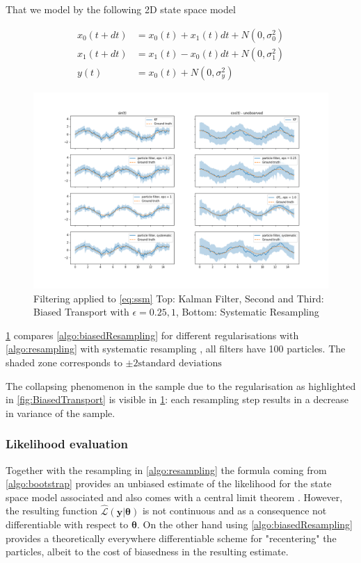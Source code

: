 \documentclass[]{article}
\begin{document}
			That we model by the following 2D state space model

			\begin{align}
				\label{eq:ssm}
				x_0(t + dt) &= x_0(t) + x_1(t) dt + N(0, \sigma_0^2)\\				
				x_1(t + dt) &= x_1(t) - x_0(t) dt + N(0, \sigma_1^2)\\
				y(t) &= x_0(t) + N(0, \sigma_y^2)
			\end{align}
			
			\begin{figure}
				\centering
				\captionsetup{justification=centering}
				\includegraphics[width=\linewidth]{KF_OptimalTransportPF_comp}
				\caption{Filtering applied to \cref{eq:ssm}
				Top: Kalman Filter, Second and Third: Biased Transport with $\epsilon=0.25,1$, Bottom: Systematic Resampling }
				\label{fig:kf_illustration}
			\end{figure}	
		
			\cref{fig:kf_illustration} compares \cref{algo:biasedResampling} for different regularisations with \cref{algo:resampling} with systematic resampling \parencite{resampling_comp}, all filters have 100 particles. The shaded zone corresponds to $\pm 2 \text{standard deviations}$ 
			
			The collapsing phenomenon in the sample due to the regularisation as highlighted in \cref{fig:BiasedTransport} is visible in \cref{fig:kf_illustration}: each resampling step results in a decrease in variance of the sample.
			
		\subsubsection{Likelihood evaluation}
			Together with the resampling in \cref{algo:resampling} the formula coming from \cref{algo:bootstrap} provides an unbiased estimate of the likelihood for the state space model associated and also comes with a central limit theorem \cite{chopin2004central}. However, the resulting function $\hat{\mathcal{L}}(\mathbf{y}|\mathbf{\theta})$ is not continuous and as a consequence not differentiable with respect to $\mathbf{\theta}$. On the other hand using \cref{algo:biasedResampling} provides a theoretically everywhere differentiable scheme for "recentering" the particles, albeit to the cost of biasedness in the resulting estimate.
			
\end{document}
